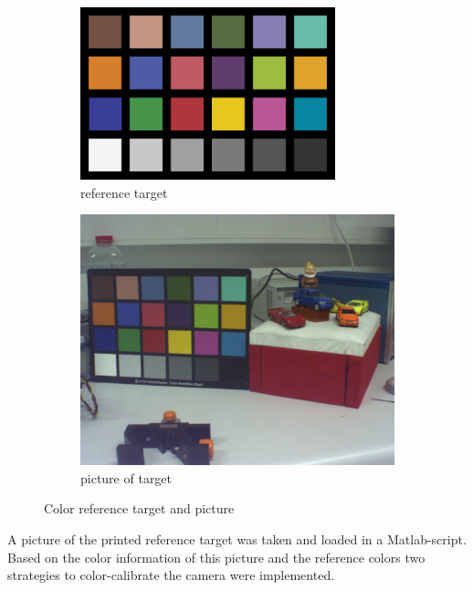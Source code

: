 \documentclass[
a4paper,     %
11pt         %
]{scrartcl}  %
\begin{document}
\begin{figure}[ht!]
\centering
\begin{subfigure}{0.49\textwidth}
  \centering
  \includegraphics[height=5cm]{./Bildg_Messtechnik_Lab/ColorCalibration/color_checker.png}
  \caption{reference target}
\end{subfigure}%
\begin{subfigure}{0.49\textwidth}
  \centering
  \includegraphics[clip, trim=0 4cm 0 4cm, width=\textwidth]{./Bildg_Messtechnik_Lab/ColorCalibration/pictures/pic_D50.png}
  \caption{picture of target}
\end{subfigure}
\caption{Color reference target and picture}
\label{fig:colCal_ref}
\end{figure}

\newcommand{\R}{\mathbb{R}}

A picture of the printed reference target was taken and loaded in a Matlab-script. Based on the color information of this picture and the reference colors two strategies to color-calibrate the camera were implemented. \\
\end{document}
